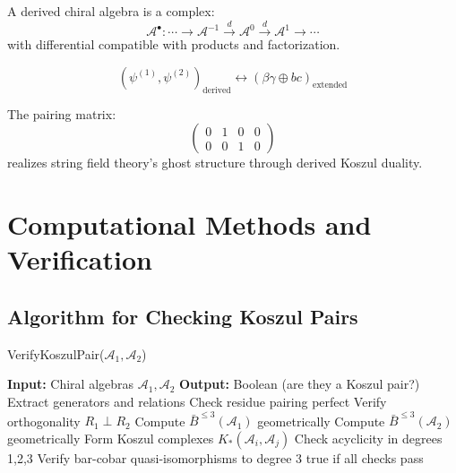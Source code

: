 \begin{definition}
A derived chiral algebra is a complex:
$$\mathcal{A}^{\bullet}: \cdots \to \mathcal{A}^{-1} \xrightarrow{d} \mathcal{A}^0 \xrightarrow{d} \mathcal{A}^1 \to \cdots$$
with differential compatible with products and factorization.
\end{definition}

\begin{theorem}
$$(\psi^{(1)}, \psi^{(2)})_{\text{derived}} \leftrightarrow (\beta\gamma \oplus bc)_{\text{extended}}$$

The pairing matrix:
$$\begin{pmatrix}
0 & 1 & 0 & 0 \\
0 & 0 & 1 & 0
\end{pmatrix}$$
realizes string field theory's ghost structure through derived Koszul duality.
\end{theorem}


\section{Computational Methods and Verification}

\subsection{Algorithm for Checking Koszul Pairs}

\begin{algorithm}
\caption{VerifyKoszulPair($\mathcal{A}_1, \mathcal{A}_2$)}
\begin{algorithmic}[1]
\State \textbf{Input:} Chiral algebras $\mathcal{A}_1, \mathcal{A}_2$
\State \textbf{Output:} Boolean (are they a Koszul pair?)
\State
{}
    \State Extract generators and relations
    \State Check residue pairing perfect
    \State Verify orthogonality $R_1 \perp R_2$
\Else
    \State Compute $\bar{B}^{\leq 3}(\mathcal{A}_1)$ geometrically
    \State Compute $\bar{B}^{\leq 3}(\mathcal{A}_2)$ geometrically
    \State Form Koszul complexes $K_*(\mathcal{A}_i, \mathcal{A}_j)$
    \State Check acyclicity in degrees 1,2,3
\EndIf
\State Verify bar-cobar quasi-isomorphisms to degree 3
\State \Return true if all checks pass
\end{algorithmic}
\end{algorithm}

